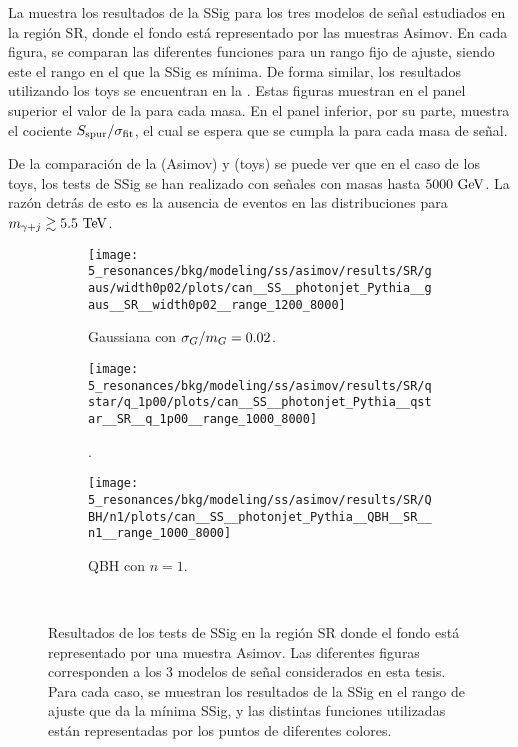 La \Fig{\ref{fig:bkg_modeling:sstest_results_asimov_SR}} muestra los resultados de la \ac{SSig} para los tres modelos de se\~nal estudiados en la región SR, donde el fondo está representado por las muestras Asimov. En cada figura, se comparan las diferentes funciones para un rango fijo de ajuste, siendo este el rango en el que la \ac{SSig} es mínima. De forma similar, los resultados utilizando los toys se encuentran en la \Fig{\ref{fig:bkg_modeling:sstest_results_toys_SR}}. Estas figuras muestran en el panel superior el valor de la \sspur para cada masa. En el panel inferior, por su parte, muestra el cociente \(S_{\text{spur}} / \sigma_{\text{fit}}\), el cual se espera que se cumpla la \Eqn{\ref{eq:bkg:modeling:sigbkg:sstest:condition}} para cada masa de se\~nal.

De la comparación de la \Fig{\ref{fig:bkg_modeling:sstest_results_asimov_SR}} (Asimov) y \Fig{\ref{fig:bkg_modeling:sstest_results_toys_SR}} (toys) se puede ver que en el caso de los toys, los tests de \ac{SSig} se han realizado con señales con masas hasta \(5000~\text{GeV}\). La razón detrás de esto es la ausencia de eventos en las distribuciones \myj para \(m_{\gamma+j} \gtrsim 5.5~\text{TeV}\).


\begin{figure}[ht!]
    \centering
    \begin{subfigure}[h]{0.32\linewidth}
        \centering
        \texttt{[image: 5\_resonances/bkg/modeling/ss/asimov/results/SR/gaus/width0p02/plots/can\_\_SS\_\_photonjet\_Pythia\_\_gaus\_\_SR\_\_width0p02\_\_range\_1200\_8000]}
        \caption{Gaussiana con \(\sigma_G / m_{G} = 0.02\).}
    \end{subfigure}
    \hfill
    \begin{subfigure}[h]{0.32\linewidth}
        \centering
        \texttt{[image: 5\_resonances/bkg/modeling/ss/asimov/results/SR/qstar/q\_1p00/plots/can\_\_SS\_\_photonjet\_Pythia\_\_qstar\_\_SR\_\_q\_1p00\_\_range\_1000\_8000]}
        \caption{\qstar.}
    \end{subfigure}
    \begin{subfigure}[h]{0.32\linewidth}
        \centering
        \texttt{[image: 5\_resonances/bkg/modeling/ss/asimov/results/SR/QBH/n1/plots/can\_\_SS\_\_photonjet\_Pythia\_\_QBH\_\_SR\_\_n1\_\_range\_1000\_8000]}
        \caption{\ac{QBH} con \(n=1\).}
    \end{subfigure}\\
    \caption{Resultados de los tests de \ac{SSig} en la región SR donde el fondo está representado por una muestra Asimov. Las diferentes figuras corresponden a los 3 modelos de se\~nal considerados en esta tesis. Para cada caso, se muestran los resultados de la \ac{SSig} en el rango de ajuste que da la mínima \ac{SSig}, y las distintas funciones utilizadas están representadas por los puntos de diferentes colores.}
    \label{fig:bkg_modeling:sstest_results_asimov_SR}
\end{figure}


